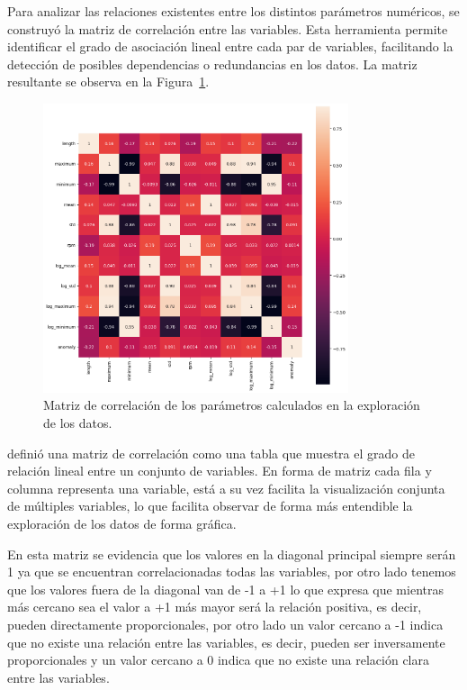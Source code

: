 \documentclass[11pt,a4paper,spanish]{book}
\numberwithin{equation}{chapter}
\numberwithin{figure}{chapter}
\begin{document}
Para analizar las relaciones existentes entre los distintos parámetros numéricos, se construyó la matriz de correlación entre las variables. Esta herramienta permite identificar el grado de asociación lineal entre cada par de variables, facilitando la detección de posibles dependencias o redundancias en los datos. La matriz resultante se observa en la Figura~\ref{fig:figCorrMat}. 


\begin{figure}[h]
    \centering
    \includegraphics[width=0.8\textwidth]{media/dataset/corr-mat.png}
    \caption{Matriz de correlación de los parámetros calculados en la exploración de los datos. }
    \label{fig:figCorrMat}
\end{figure}


\cite{Alvarez2023} definió una matriz de correlación como una tabla que muestra el grado de relación lineal entre un conjunto de variables. En forma de matriz cada fila y columna representa una variable, está a su vez facilita la visualización conjunta de múltiples variables, lo que facilita observar de forma más entendible la exploración de los datos de forma gráfica.


En esta matriz se evidencia que los valores en la diagonal principal siempre serán 1 ya que se encuentran correlacionadas todas las variables, por otro lado tenemos que los valores fuera de la diagonal van de -1 a +1 lo que expresa que mientras más cercano sea el valor a +1 más mayor será la relación positiva, es decir, pueden directamente proporcionales, por otro lado un valor cercano a -1 indica que no existe una relación entre las variables, es decir, pueden ser inversamente proporcionales y un valor cercano a 0 indica que no existe una relación clara entre las variables. \cite{Alvarez2023}
\end{document}
